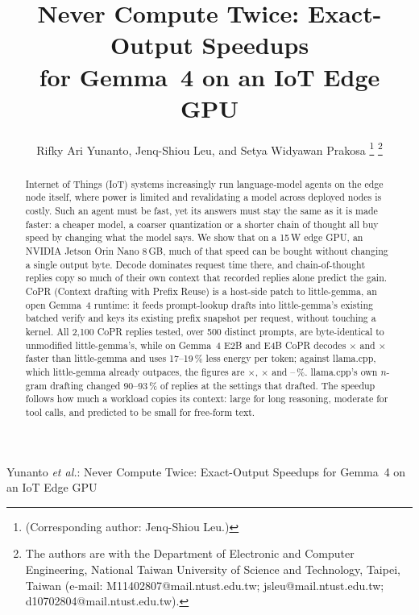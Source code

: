 \documentclass[lettersize,journal]{IEEEtran}
\newcommand{\sys}{CoPR}
\newcommand{\lc}{llama.cpp}
\newcommand{\lgm}{little-gemma}
\begin{document}
\title{Never Compute Twice: Exact-Output Speedups\\for Gemma~4 on an IoT Edge GPU}

\author{Rifky Ari Yunanto, Jenq-Shiou Leu, and Setya Widyawan Prakosa
\thanks{(Corresponding author: Jenq-Shiou Leu.)}
\thanks{The authors are with the Department of Electronic and Computer
Engineering, National Taiwan University of Science and Technology, Taipei,
Taiwan (e-mail: M11402807@mail.ntust.edu.tw; jsleu@mail.ntust.edu.tw;
d10702804@mail.ntust.edu.tw).}}

%
{Yunanto \MakeLowercase{\textit{et al.}}: Never Compute Twice: Exact-Output Speedups for Gemma~4 on an IoT Edge GPU}

\maketitle

\begin{abstract}
Internet of Things (IoT) systems increasingly run language-model agents on the
edge node itself, where power is limited and revalidating a model across
deployed nodes is costly. Such an agent must be fast, yet its answers must stay
the same as it is made faster: a cheaper model, a coarser quantization or a
shorter chain of thought all buy speed by changing what the model says. We show
that on a 15\,W edge GPU, an NVIDIA Jetson Orin Nano 8\,GB, much of that speed
can be bought without changing a single output byte. Decode dominates
request time there, and chain-of-thought replies copy so much of their own
context that recorded replies alone predict the gain. \sys{} (Context drafting
with Prefix Reuse) is a host-side patch to \lgm{}, an open Gemma~4 runtime: it
feeds prompt-lookup drafts into \lgm{}'s existing batched verify and keys its
existing prefix snapshot per request, without touching a kernel. All 2{,}100
\sys{} replies tested, over 500 distinct prompts, are byte-identical to
unmodified \lgm{}'s, while on Gemma~4 E2B and E4B \sys{} decodes
\EtwoSpG$\times$ and \EfourSpG$\times$ faster than \lgm{} and uses 17--19\,\% less
energy per token; against \lc{}, which \lgm{} already outpaces, the
figures are \EtwoSpL$\times$, \EfourSpL$\times$ and \EtwoJsav--\EfourJsav\,\%.
\lc{}'s own $n$-gram drafting changed 90--93\,\% of replies at the settings
that drafted. The speedup follows how much a workload copies its context:
large for long reasoning, moderate for tool calls, and predicted to be small
for free-form text.
\end{abstract}
\end{document}
